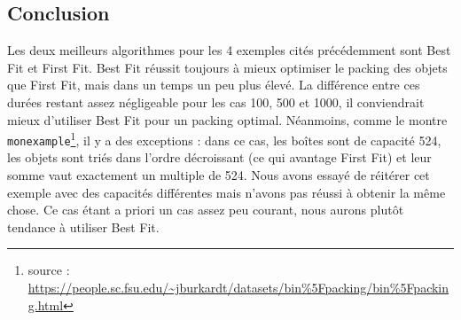 \documentclass{article}
\begin{document}
\clearpage
\subsection{Conclusion}

Les deux meilleurs algorithmes pour les 4 exemples cités précédemment sont Best Fit et First Fit.
Best Fit réussit toujours à mieux optimiser le packing des objets que First Fit, mais dans un temps un peu plus élevé.
La différence entre ces durées restant assez négligeable pour les cas 100, 500 et 1000, il conviendrait mieux d'utiliser Best Fit pour un packing optimal.
Néanmoins, comme le montre \texttt{monexample}\footnote{source : \url{https://people.sc.fsu.edu/~jburkardt/datasets/bin\%5Fpacking/bin\%5Fpacking.html}}, il y a des exceptions : dans ce cas, les boîtes sont de capacité 524,
les objets sont triés dans l'ordre décroissant (ce qui avantage First Fit) et leur somme vaut exactement un multiple de 524.
Nous avons essayé de réitérer cet exemple avec des capacités différentes mais n'avons pas réussi à obtenir la même chose.
Ce cas étant a priori un cas assez peu courant, nous aurons plutôt tendance à utiliser Best Fit.
\end{document}
